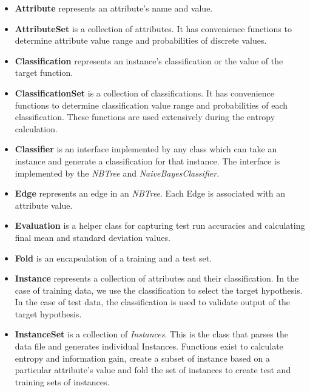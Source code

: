 \documentclass[10pt]{report}
\begin{document}
\begin{itemize}
\item \textbf{Attribute} represents an attribute's name and value.

\item \textbf{AttributeSet} is a collection of attributes. It has
  convenience functions to determine attribute value range and
  probabilities of discrete values.

\item \textbf{Classification} represents an instance's classification
  or the value of the target function.

\item \textbf{ClassificationSet} is a collection of
  classifications. It has convenience functions to determine
  classification value range and probabilities of each
  classification. These functions are used extensively during the
  entropy calculation. 

\item \textbf{Classifier} is an interface implemented by any class
  which can take an instance and generate a classification for that
  instance. The interface is implemented by the \textit{NBTree} and
  \textit{NaiveBayesClassifier}.


\item \textbf{Edge} represents an edge in an \textit{NBTree}. Each Edge
  is associated with an attribute value.

\item \textbf{Evaluation} is a helper class for capturing test run
  accuracies and calculating final mean and standard deviation values.

\item \textbf{Fold} is an encapsulation of a training and a test set.

\item \textbf{Instance} represents a collection of attributes and
  their classification. In the case of training data, we use the
  classification to select the target hypothesis. In the case of test
  data, the classification is used to validate output of the target
  hypothesis.

\item \textbf{InstanceSet} is a collection of \textit{Instances}. This is the
  class that parses the data file and generates individual
  Instances. Functions exist to calculate entropy and information
  gain, create a subset of instance based on a particular attribute's
  value and fold the set of instances to create test and training sets
  of instances.


\end{itemize}
\end{document}
